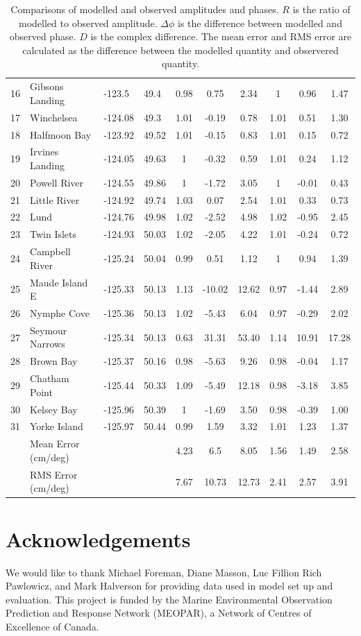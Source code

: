 \documentclass[pdftex,10pt]{article}
\begin{document}
\begin{table}[h]
\begin{tabular}{l l l l c c c c c c}
16 & Gibsons Landing & -123.5 & 49.4 & 0.98 & 0.75 & 2.34  & 1 & 0.96 & 1.47 \\
17 & Winchelsea & -124.08 & 49.3 & 1.01 & -0.19 & 0.78  & 1.01 & 0.51 & 1.30 \\
18 & Halfmoon Bay & -123.92 & 49.52 & 1.01 & -0.15 & 0.83  & 1.01 & 0.15 & 0.72\\ 
19 & Irvines Landing & -124.05 & 49.63 & 1 & -0.32 & 0.59  & 1.01 & 0.24 & 1.12 \\
20 & Powell River & -124.55 & 49.86 & 1 & -1.72 & 3.05  & 1 & -0.01 & 0.43 \\
21 & Little River & -124.92 & 49.74 & 1.03 & 0.07 & 2.54  & 1.01 & 0.33 & 0.73\\ 
22 & Lund & -124.76 & 49.98 & 1.02 & -2.52 & 4.98  & 1.02 & -0.95 & 2.45 \\
23 & Twin Islets & -124.93 & 50.03 & 1.02 & -2.05 & 4.22  & 1.01 & -0.24 & 0.72\\ 
24 & Campbell River & -125.24 & 50.04 & 0.99 & 0.51 & 1.12  & 1 & 0.94 & 1.39 \\
25 & Maude Island E & -125.33 & 50.13 & 1.13 & -10.02 & 12.62  & 0.97 & -1.44 & 2.89\\ 
26 & Nymphe Cove & -125.36 & 50.13 & 1.02 & -5.43 & 6.04  & 0.97 & -0.29 & 2.02 \\
27 & Seymour Narrows & -125.34 & 50.13 & 0.63 & 31.31 & 53.40  & 1.14 & 10.91 & 17.28 \\
28 & Brown Bay & -125.37 & 50.16 & 0.98 & -5.63 & 9.26  & 0.98 & -0.04 & 1.17 \\
29 & Chatham Point & -125.44 & 50.33 & 1.09 & -5.49 & 12.18  & 0.98 & -3.18 & 3.85 \\
30 & Kelsey Bay & -125.96 & 50.39 & 1 & -1.69 & 3.50  & 0.98 & -0.39 & 1.00 \\
31 & Yorke Island & -125.97 & 50.44 & 0.99 & 1.59 & 3.32  & 1.01 & 1.23 & 1.37\\ 
\hline 
&   Mean Error (cm/deg) & & & 4.23  & 6.5 & 8.05   & 1.56 & 1.49 & 2.58 \\
&   RMS Error (cm/deg)  & & & 7.67  & 10.73 & 12.73 & 2.41 & 2.57 & 3.91 \\
\hline  
\end{tabular}
\caption{Comparisons of modelled and observed amplitudes and phases. $R$ is the ratio of modelled to observed amplitude. $\Delta \phi$ is the difference between modelled and observed phase. $D$ is the complex difference. The mean error and RMS error are calculated as the difference between the modelled quantity and observered quantity. }
\label{tab:comparison} 
\end{table}


\section{Acknowledgements}\label{sec:ack}
We would like to thank Michael Foreman, Diane Masson, Luc Fillion Rich Pawlowicz, and Mark Halverson for providing data used in model set up and evaluation. This project is funded by the Marine Environmental Observation Prediction and Response Network (MEOPAR), a Network of Centres of Excellence of Canada. 




\end{document}
